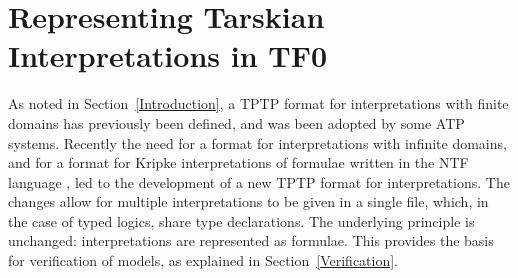 \documentclass{easychair}
\begin{document}
\section{Representing Tarskian Interpretations in TF0}
\label{TarskianTF0}

As noted in Section~\ref{Introduction}, a TPTP format for interpretations with finite domains 
has previously been defined, and was been adopted by some ATP systems.
Recently the need for a format for interpretations with infinite domains, and for a format for 
Kripke interpretations \cite{Kri63} of formulae written in the NTF language \cite{SF+22}, 
led to the development of a new TPTP format for interpretations.
The changes allow for multiple interpretations to be given in a single file, which, in the case 
of typed logics, share type declarations.
The underlying principle is unchanged: interpretations are represented as formulae.
This provides the basis for verification of models, as explained in Section~\ref{Verification}.
\end{document}
